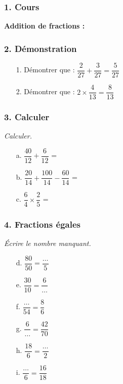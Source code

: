 \subsubsection*{1. Cours}

\textbf{Addition de fractions : } \dotfill \\
\Pointilles[1]

\subsubsection*{2. Démonstration}

\begin{multicols}{2}
\begin{enumerate}
  \item[1.] Démontrer que : $\dfrac{2}{27} + \dfrac{3}{27} = \dfrac{5}{27}$ 
  \item[2.] Démontrer que : $2 \times \dfrac{4}{13} = \dfrac{8}{13}$ 
\end{enumerate}
\end{multicols}

\Pointilles[14]

\subsubsection*{3. Calculer}
\textit{Calculer.}

\begin{multicols}{3}
\begin{enumerate}
  \item[a.] $\dfrac{40}{12} + \dfrac{6}{12}$ = \dotfill 
  \item[b.] $\dfrac{20}{14} + \dfrac{100}{14} - \dfrac{60}{14}$ = \dotfill 
  \item[c.] $\dfrac{6}{4} \times \dfrac{2}{5}$ = \dotfill 
\end{enumerate}
\end{multicols}

\subsubsection*{4. Fractions égales}
\textit{Écrire le nombre manquant.}

\begin{multicols}{3}
\begin{enumerate}
  \item[d.] $\dfrac{80}{50} = \dfrac{\ldots}{5}$
  \item[e.] $\dfrac{30}{10} = \dfrac{6}{\ldots}$
  \item[f.] $\dfrac{\ldots}{54} = \dfrac{8}{6}$
  \item[g.] $\dfrac{6}{\ldots} = \dfrac{42}{70}$
  \item[h.] $\dfrac{18}{6} = \dfrac{\ldots}{2}$
  \item[i.] $\dfrac{\ldots}{6} = \dfrac{16}{18}$ 
\end{enumerate}
\end{multicols}

